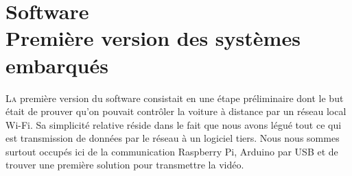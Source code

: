 \documentclass[a4paper,11pt]{report}
\begin{document}
{\chapter{Software \\  Première version des systèmes embarqués}

\lettrine{L}{a} première version du software consistait en une étape préliminaire dont le but était de prouver qu'on pouvait contrôler la voiture à distance par un réseau local Wi-Fi. Sa simplicité relative réside dans le fait que nous avons légué tout ce qui est transmission de données par le réseau à un logiciel tiers. Nous nous sommes surtout occupés ici de la communication Raspberry Pi, Arduino par USB et de trouver une première solution pour transmettre la vidéo.

}
\end{document}
